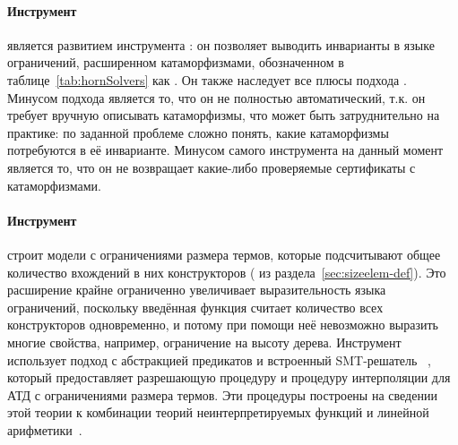 \paragraph{Инструмент \racer{}~\cite{10.1145/3498722}} является развитием инструмента \spacer{}: он позволяет выводить инварианты в языке ограничений, расширенном катаморфизмами, обозначенном в таблице~\ref{tab:hornSolvers} как \catelemclass{}. Он также наследует все плюсы подхода \spacer{}. Минусом подхода является то, что он не полностью автоматический, т.\:к. он требует вручную описывать катаморфизмы, что может быть затруднительно на практике: по заданной проблеме сложно понять, какие катаморфизмы потребуются в её инварианте. Минусом самого инструмента на данный момент является то, что он не возвращает какие-либо проверяемые сертификаты с катаморфизмами.

\paragraph{Инструмент \eldarica{}~\cite{8603013}} строит модели с ограничениями размера термов, которые подсчитывают общее количество вхождений в них конструкторов (\sizeelemclass{} из раздела~\cref{sec:sizeelem-def}).
Это расширение крайне ограниченно увеличивает выразительность языка ограничений, поскольку введённая функция считает количество всех конструкторов одновременно, и потому при помощи неё невозможно выразить многие свойства, например, ограничение на высоту дерева.
Инструмент \eldarica{} использует подход \cegar{} с абстракцией предикатов и встроенный SMT-решатель \princess{}~\cite{princess}, который предоставляет разрешающую процедуру и процедуру интерполяции для АТД с ограничениями размера термов. Эти процедуры построены на сведении этой теории к комбинации теорий неинтерпретируемых функций и линейной арифметики~\cite{hojjat2017deciding}.


